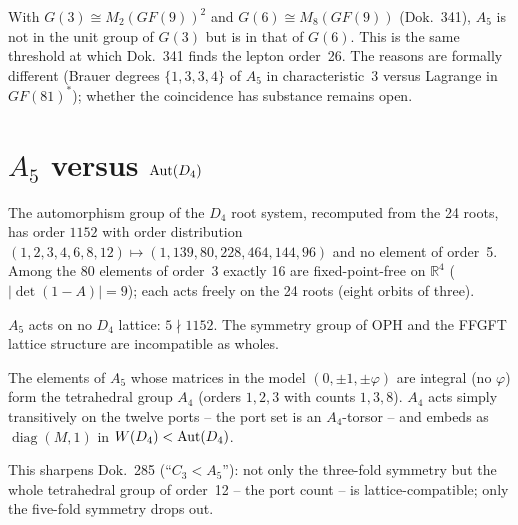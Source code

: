 \begin{corollary}
With $G(3)\cong M_2(GF(9))^2$ and $G(6)\cong M_8(GF(9))$ (Dok.~341), $A_5$
is not in the unit group of $G(3)$ but is in that of $G(6)$. This is the
same threshold at which Dok.~341 finds the lepton order~26. The reasons
are formally different (Brauer degrees $\{1,3,3,4\}$ of $A_5$ in
characteristic~3 versus Lagrange in $GF(81)^*$); whether the coincidence
has substance remains open.
\end{corollary}

\section[A5 versus Aut(D4)]{$A_5$ versus ${\rm Aut}(D_4)$}\label{sec:d4}

\begin{theorem}\label{thm:aut}
The automorphism group of the $D_4$ root system, recomputed from the 24
roots, has order $1152$ with order distribution
$(1,2,3,4,6,8,12)\mapsto(1,139,80,228,464,144,96)$ and no element of
order~5. Among the 80 elements of order~3 exactly 16 are fixed-point-free
on $\mathbb{R}^4$ ($|\det(1-A)|=9$); each acts freely on the 24 roots
(eight orbits of three).
\end{theorem}

\begin{corollary}[\XM]
$A_5$ acts on no $D_4$ lattice: $5\nmid1152$. The symmetry group of OPH
and the FFGFT lattice structure are incompatible as wholes.
\end{corollary}

\begin{theorem}\label{thm:a4}
The elements of $A_5$ whose matrices in the model $(0,\pm1,\pm\varphi)$
are integral (no $\varphi$) form the tetrahedral group $A_4$ (orders
$1,2,3$ with counts $1,3,8$). $A_4$ acts simply transitively on the twelve
ports -- the port set is an $A_4$-torsor -- and embeds as
$\operatorname{diag}(M,1)$ in $W(D_4)<{\rm Aut}(D_4)$.
\end{theorem}

This sharpens Dok.~285 (\enquote{$C_3<A_5$}): not only the three-fold
symmetry but the whole tetrahedral group of order~12 -- the port count --
is lattice-compatible; only the five-fold symmetry drops out.

